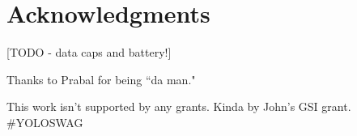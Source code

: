 \section{Acknowledgments}
\label{sec:ack}

[TODO - data caps and battery!]

Thanks to Prabal for being ``da man."

This work isn't supported by any grants. Kinda by John's GSI grant. \#YOLOSWAG
